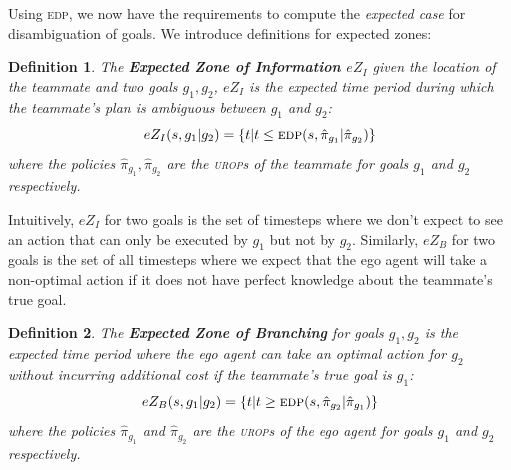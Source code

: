 \documentclass[letterpaper]{article}
\newtheorem{definition}{Definition}
\begin{document}
Using \textsc{edp}, we now have the requirements to compute the \emph{expected case} for disambiguation of goals. We introduce definitions for expected zones: %
\begin{definition}
The \textbf{Expected Zone of Information $eZ_I$} given the location of the teammate and two goals $g_1, g_2$, $eZ_I$ is the expected time period during which the teammate's plan is ambiguous between $g_1$ and $g_2$:
\begin{equation*}
    eZ_I(s, g_1 | g_2) = \{t| t \leq \textsc{edp}(s, \hat{\pi}_{g_1} | \hat{\pi}_{g_2})\}
\end{equation*}
where the policies $\hat{\pi}_{g_1},\hat{\pi}_{g_2}$ are the \textsc{urop}s of the teammate for goals $g_1$ and $g_2$ respectively.

\end{definition}

\noindent Intuitively, $eZ_I$ for two goals is the set of timesteps where we don't expect to see an action that can only be executed by $g_1$ but not by $g_2$. Similarly, $eZ_B$ for two goals is the set of all timesteps where we expect that the ego agent will take a non-optimal action if it does not have perfect knowledge about the teammate’s true goal.

\begin{definition}
The \textbf{Expected Zone of Branching} for goals $g_1, g_2$ is the expected time period where the ego agent can take an optimal action for $g_2$ without incurring additional cost if the teammate's true goal is $g_1$:
\begin{equation*}
    eZ_B(s, g_1 | g_2) = \{t | t \geq \textsc{edp}(s, \hat{\pi}_{g_2} | \hat{\pi}_{g_1})\}
\end{equation*}
where the policies $\hat{\pi}_{g_1}$ and $\hat{\pi}_{g_2}$ are the \textsc{urop}s of the \emph{ego agent} for goals $g_1$ and $g_2$ respectively.%
\end{definition}
\end{document}
